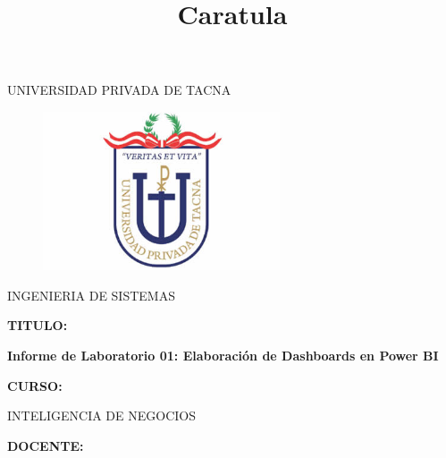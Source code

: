 \documentclass[12pt,letterpaper]{article}
\begin{document}
\title{Caratula}

\begin{titlepage}
\begin{center}
\large{UNIVERSIDAD PRIVADA DE TACNA}\\
\vspace*{-0.025in}
\begin{figure}[htb]
\begin{center}
\includegraphics[width=7cm]{./images/logo}
\end{center}
\end{figure}
\vspace*{0.15in}
INGENIERIA DE SISTEMAS  \\

\vspace*{0.3in}
\begin{large}
\textbf{TITULO:} \\
\end{large}

\vspace*{0.1in}
\begin{Large}
\textbf{Informe de Laboratorio 01: Elaboración de Dashboards en Power BI} \\

\end{Large}

\vspace*{0.3in}
\begin{Large}
\textbf{CURSO:} \\
\end{Large}

\vspace*{0.1in}
\begin{large}
INTELIGENCIA DE NEGOCIOS\\
\end{large}

\vspace*{0.3in}
\begin{Large}
\textbf{DOCENTE:} \\
\end{Large}


\end{center}
\end{titlepage}
\end{document}
